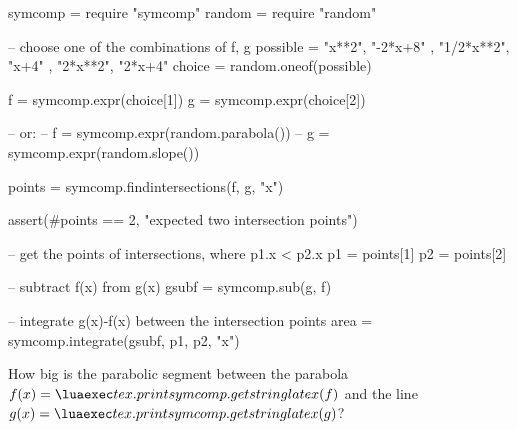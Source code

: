 \begin{luacode*}
    symcomp = require "symcomp"
    random = require "random"

    -- choose one of the combinations of { f, g }
    possible = { { "x**2", "-2*x+8" }, { "1/2*x**2", "x+4" }, { "2*x**2", "2*x+4" } }
    choice = random.oneof(possible)

    f = symcomp.expr(choice[1])
    g = symcomp.expr(choice[2])

    -- or:
    -- f = symcomp.expr(random.parabola())
    -- g = symcomp.expr(random.slope())

    points = symcomp.findintersections(f, g, "x")

    assert(#points == 2, "expected two intersection points")

    -- get the points of intersections, where p1.x < p2.x
    p1 = points[1]
    p2 = points[2]

    -- subtract f(x) from g(x)
    gsubf = symcomp.sub(g, f)

    -- integrate g(x)-f(x) between the intersection points
    area = symcomp.integrate(gsubf, p1, p2, "x")
\end{luacode*}

\question[k]
How big is the parabolic segment between the parabola $f(x)=\scprint{f}$ and the line $g(x)=\scprint{g}$?

